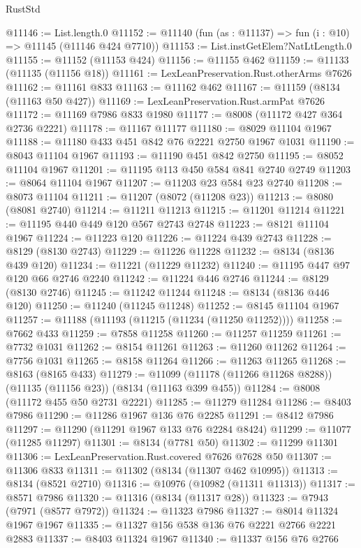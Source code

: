 \begin{lexlean}{RustStd}
\begin{coremodule}
@11146 := List.length.{0}
@11152 := @11140 (fun (as : @11137) => fun (i : @10) => @11145 (@11146 @424 @7710))
@11153 := List.instGetElem?NatLtLength.{0}
@11155 := @11152 (@11153 @424)
@11156 := @11155 @462
@11159 := @11133 (@11135 (@11156 @18))
@11161 := LexLeanPreservation.Rust.otherArms @7626
@11162 := @11161 @833
@11163 := @11162 @462
@11167 := @11159 (@8134 (@11163 @50 @427))
@11169 := LexLeanPreservation.Rust.armPat @7626
@11172 := @11169 @7986 @833 @1980
@11177 := @8008 (@11172 @427 @364 @2736 @2221)
@11178 := @11167 @11177
@11180 := @8029 @11104 @1967
@11188 := @11180 @433 @451 @842 @76 @2221 @2750 @1967 @1031
@11190 := @8043 @11104 @1967
@11193 := @11190 @451 @842 @2750
@11195 := @8052 @11104 @1967
@11201 := @11195 @113 @450 @584 @841 @2740 @2749
@11203 := @8064 @11104 @1967
@11207 := @11203 @23 @584 @23 @2740
@11208 := @8073 @11104
@11211 := @11207 (@8072 (@11208 @23))
@11213 := @8080 (@8081 @2740)
@11214 := @11211 @11213
@11215 := @11201 @11214
@11221 := @11195 @440 @449 @120 @567 @2743 @2748
@11223 := @8121 @11104 @1967
@11224 := @11223 @120
@11226 := @11224 @439 @2743
@11228 := @8129 (@8130 @2743)
@11229 := @11226 @11228
@11232 := @8134 (@8136 @439 @120)
@11234 := @11221 (@11229 @11232)
@11240 := @11195 @447 @97 @120 @66 @2746 @2240
@11242 := @11224 @446 @2746
@11244 := @8129 (@8130 @2746)
@11245 := @11242 @11244
@11248 := @8134 (@8136 @446 @120)
@11250 := @11240 (@11245 @11248)
@11252 := @8145 @11104 @1967
@11257 := @11188 (@11193 (@11215 (@11234 (@11250 @11252))))
@11258 := @7662 @433
@11259 := @7858 @11258
@11260 := @11257 @11259
@11261 := @7732 @1031
@11262 := @8154 @11261
@11263 := @11260 @11262
@11264 := @7756 @1031
@11265 := @8158 @11264
@11266 := @11263 @11265
@11268 := @8163 (@8165 @433)
@11279 := @11099 (@11178 (@11266 @11268 @8288)) (@11135 (@11156 @23)) (@8134 (@11163 @399 @455))
@11284 := @8008 (@11172 @455 @50 @2731 @2221)
@11285 := @11279 @11284
@11286 := @8403 @7986
@11290 := @11286 @1967 @136 @76 @2285
@11291 := @8412 @7986
@11297 := @11290 (@11291 @1967 @133 @76 @2284 @8424)
@11299 := @11077 (@11285 @11297)
@11301 := @8134 (@7781 @50)
@11302 := @11299 @11301
@11306 := LexLeanPreservation.Rust.covered @7626 @7628 @50
@11307 := @11306 @833
@11311 := @11302 (@8134 (@11307 @462 @10995))
@11313 := @8134 (@8521 @2710)
@11316 := @10976 (@10982 (@11311 @11313))
@11317 := @8571 @7986
@11320 := @11316 (@8134 (@11317 @28))
@11323 := @7943 (@7971 (@8577 @7972))
@11324 := @11323 @7986
@11327 := @8014 @11324 @1967 @1967
@11335 := @11327 @156 @538 @136 @76 @2221 @2766 @2221 @2883
@11337 := @8403 @11324 @1967
@11340 := @11337 @156 @76 @2766

\end{coremodule}
\end{lexlean}

